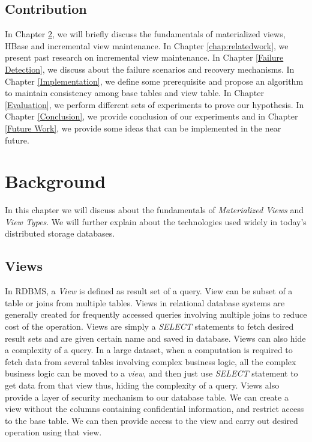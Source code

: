 \documentclass[11pt,a4paper,bibtotoc,idxtotoc,headsepline,footsepline,footexclude,BCOR12mm,DIV13]{scrbook}
\begin{document}
\section{Contribution}
In Chapter \ref{chap:background}, we will briefly discuss the fundamentals of materialized views, HBase and incremental view maintenance. In Chapter \ref{chap:relatedwork}, we present past research on incremental view maintenance. In Chapter \ref{Failure Detection}, we discuss about the failure scenarios and recovery mechanisms. In Chapter \ref{Implementation}, we define some prerequisite and propose an algorithm to maintain consistency among base tables and view table. In Chapter \ref{Evaluation}, we perform different sets of experiments to prove our hypothesis. In Chapter \ref{Conclusion}, we provide conclusion of our experiments and in Chapter \ref{Future Work}, we provide some ideas that can be implemented in the near future.


\chapter{Background}
\label{chap:background}

In this chapter we will discuss about the fundamentals of \emph{Materialized Views} and \emph{View Types}. We will further explain about the technologies used widely in today's distributed storage databases. 

\section{Views}
In RDBMS, a \emph{View} is defined as result set of a query. View can be subset of a table or joins from multiple tables. Views in relational database systems are generally created for frequently accessed queries involving multiple joins to reduce cost of the operation. Views are simply a \emph{SELECT} statements to fetch desired result sets and are given certain name and saved in database. Views can also hide a complexity of a query. In a large dataset, when a computation is required to fetch data from several tables involving complex business logic, all the complex business logic can be moved to a \emph{view}, and then just use \emph{SELECT} statement to get data from that view thus, hiding the complexity of a query. Views also provide a layer of security mechanism to our database table. We can create a view without the columns containing confidential information, and restrict access to the base table. We can then provide access to the view and carry out desired operation using that view. 
\end{document}

